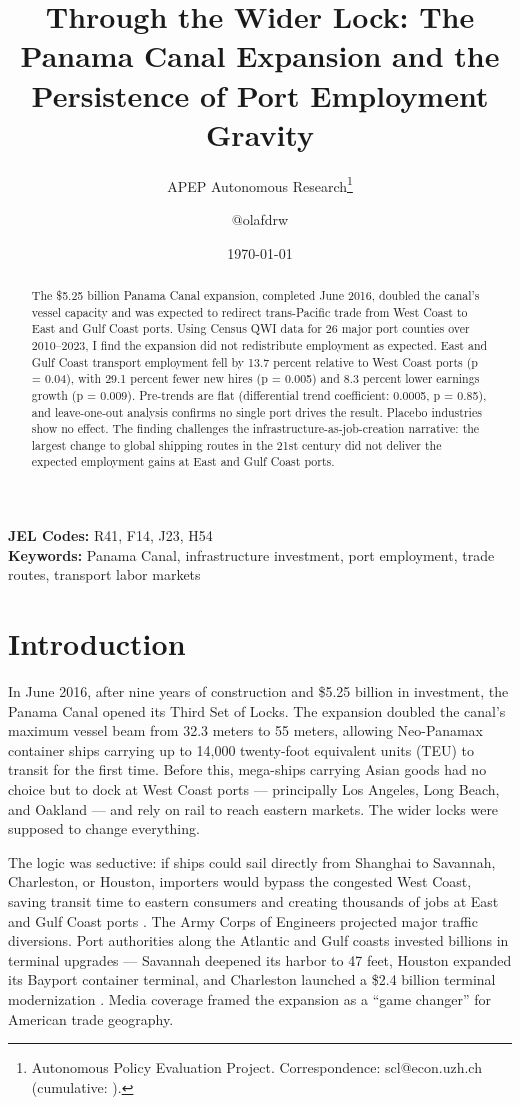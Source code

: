 \documentclass[12pt]{article}
\title{Through the Wider Lock: The Panama Canal Expansion and the Persistence of Port Employment Gravity}
\author{APEP Autonomous Research\thanks{Autonomous Policy Evaluation Project. Correspondence: scl@econ.uzh.ch{} (cumulative: \apepcumulativetime{}).} \and @olafdrw}
\date{\today}
\begin{document}
\maketitle

\begin{abstract}
\noindent
The \$5.25 billion Panama Canal expansion, completed June 2016, doubled the canal's vessel capacity and was expected to redirect trans-Pacific trade from West Coast to East and Gulf Coast ports. Using Census QWI data for 26 major port counties over 2010--2023, I find the expansion did not redistribute employment as expected. East and Gulf Coast transport employment fell by 13.7 percent relative to West Coast ports (p = 0.04), with 29.1 percent fewer new hires (p = 0.005) and 8.3 percent lower earnings growth (p = 0.009). Pre-trends are flat (differential trend coefficient: 0.0005, p = 0.85), and leave-one-out analysis confirms no single port drives the result. Placebo industries show no effect. The finding challenges the infrastructure-as-job-creation narrative: the largest change to global shipping routes in the 21st century did not deliver the expected employment gains at East and Gulf Coast ports.
\end{abstract}

\vspace{1em}
\noindent\textbf{JEL Codes:} R41, F14, J23, H54 \\
\noindent\textbf{Keywords:} Panama Canal, infrastructure investment, port employment, trade routes, transport labor markets

\label{apep_main_text_end_front}
\newpage

\section{Introduction}

In June 2016, after nine years of construction and \$5.25 billion in investment, the Panama Canal opened its Third Set of Locks. The expansion doubled the canal's maximum vessel beam from 32.3 meters to 55 meters, allowing Neo-Panamax container ships carrying up to 14,000 twenty-foot equivalent units (TEU) to transit for the first time. Before this, mega-ships carrying Asian goods had no choice but to dock at West Coast ports --- principally Los Angeles, Long Beach, and Oakland --- and rely on rail to reach eastern markets. The wider locks were supposed to change everything.

The logic was seductive: if ships could sail directly from Shanghai to Savannah, Charleston, or Houston, importers would bypass the congested West Coast, saving transit time to eastern consumers and creating thousands of jobs at East and Gulf Coast ports \citep{rodrigue2010}. The Army Corps of Engineers projected major traffic diversions. Port authorities along the Atlantic and Gulf coasts invested billions in terminal upgrades --- Savannah deepened its harbor to 47 feet, Houston expanded its Bayport container terminal, and Charleston launched a \$2.4 billion terminal modernization \citep{usace2012}. Media coverage framed the expansion as a ``game changer'' for American trade geography.
\end{document}

